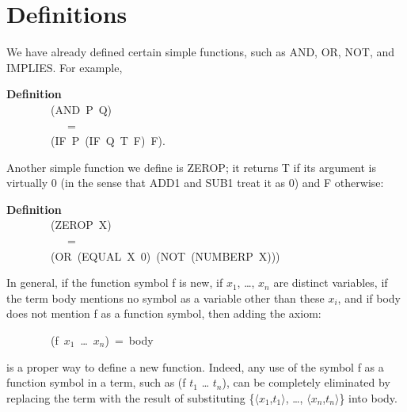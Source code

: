 \documentclass[10pt]{book}
\newenvironment{pubasis}{\begin{flushleft}}{\end{flushleft}}
\newcommand{\axiomordefinition}[1]{\vspace{6pt}\Large\textsf{\textbf{#1}}\normalsize}
\begin{document}
\hrulefill 

\section{Definitions}
We have already defined certain
simple functions, such as AND, OR, NOT, and IMPLIES.  For example,
\begin{pubasis}
\axiomordefinition{Definition}\\
~~~~~~~~(AND~P~Q)\\
~~~~~~~~~~~=\\
~~~~~~~~(IF~P~(IF~Q~T~F)~F).\\
\end{pubasis}
Another simple function we  define is ZEROP;  it returns
T if its argument is virtually 0 (in the sense that ADD1 and
SUB1 treat it as 0) and F otherwise:
\begin{pubasis}

\hrulefill 

\axiomordefinition{Definition}\\
~~~~~~~~(ZEROP~X)\\
~~~~~~~~~~~=\\
~~~~~~~~(OR~(EQUAL~X~0)~(NOT~(NUMBERP~X)))\\

\hrulefill 
\end{pubasis}
In general, if the function symbol f is new, if
$x_{1}$, \ldots{}, $x_{n}$ are distinct variables,
if the term body mentions no symbol as a variable other than these
$x_{i}$,  and if body does not mention f as a function symbol,
then adding the axiom:
\begin{pubasis}
~~~~~~~~(f~$x_{1}$~\ldots{}~$x_{n}$)~=~body\\
\end{pubasis}
is a proper way to define a new function.
Indeed, any use of the symbol f as a function symbol in a term, such
as (f $t_{1}$ \ldots{} $t_{n}$), can be completely eliminated by replacing the term
with the result of substituting \{$\langle x_{1}$,$t_{1} \rangle$, \ldots{}, $\langle x_{n}$,$t_{n} \rangle$\}
into body.
\end{document}
